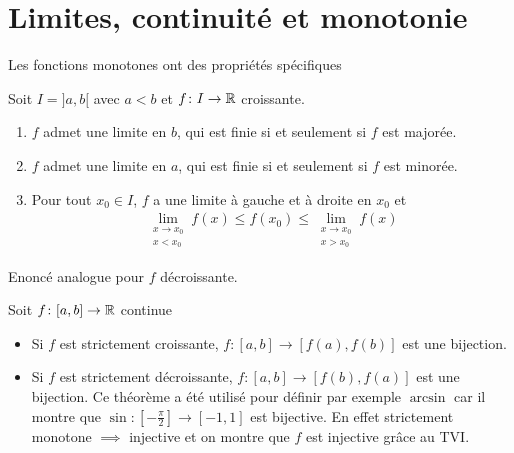 \section{Limites, continuité et monotonie}
Les fonctions monotones ont des propriétés spécifiques 
\begin{graybox}
\begin{theoreme}
Soit $I=]a, b[$ avec $a < b$ et $f \colon I \to \mathbb{R}$ croissante.
\begin{enumerate}
\item $f$ admet une limite en $b$, qui est finie si et seulement si $f$ est majorée.
\item $f$ admet une limite en $a$, qui est finie si et seulement si $f$ est minorée.
\item Pour tout $x_0 \in I$, $f$ a une limite à gauche et à droite en $x_0$
et 
\begin{align*}
\lim_{\substack{x \to x_0 \\ x < x_0}} f(x) \leq f(x_0) \leq \lim_{\substack{x \to x_0 \\ x > x_0}} f(x)
\end{align*}
\end{enumerate}
Enoncé analogue pour $f$ décroissante.
\end{theoreme}
\end{graybox}

\begin{graybox}
\begin{theoreme}
Soit $f \colon [a, b] \to \mathbb{R}$ continue
\begin{itemize}
\item Si $f$ est strictement croissante, $f \colon [a, b] \to [f(a), f(b)]$ est une bijection.
\item Si $f$ est strictement décroissante, $f \colon [a, b] \to [f(b), f(a)]$ est une bijection. 
Ce théorème a été utilisé pour définir par exemple $\arcsin$ car il montre que $\sin \colon \left[-\frac{\pi}{2}\right] \to [-1,1]$ est bijective.
En effet strictement monotone $\implies$ injective et on montre que $f$ est injective grâce au TVI.
\end{itemize}
\end{theoreme}
\end{graybox}

